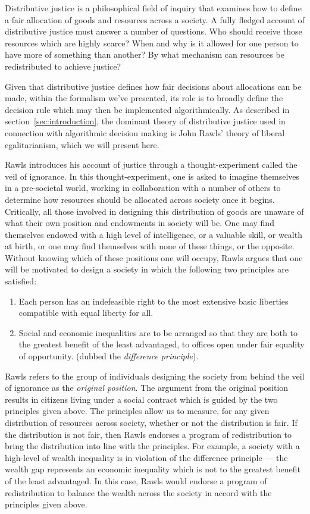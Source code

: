 Distributive justice is a philosophical field of inquiry that examines how to
define a fair allocation of goods and resources across a society. A fully
fledged account of distributive justice must answer a number of questions. Who
should receive those resources which are highly scarce? When and why is it 
allowed for one person to have more of something than another? By what mechanism
can resources be redistributed to achieve justice?

Given that distributive justice defines how fair decisions about allocations can
be made, within the formalism we've presented, its role is to broadly define the
decision rule which may then be implemented algorithmically. As described in
section~\ref{sec:introduction}, the dominant theory of distributive justice used
in connection with algorithmic decision making is John Rawls' theory of liberal
egalitarianism, which we will present here.

Rawls introduces his account of justice through a thought-experiment called the
veil of ignorance. In this thought-experiment, one is asked to imagine
themselves in a pre-societal world, working in collaboration with a number of
others to determine how resources should be allocated across society once it
begins. Critically, all those involved in designing this distribution of goods
are unaware of what their own position and endowments in society will be. One
may find themselves endowed with a high level of intelligence, or a valuable
skill, or wealth at birth, or one may find themselves with none of these things,
or the opposite. Without knowing which of these positions one will occupy,
Rawls argues that one will be motivated to design a society in which the
following two principles are satisfied:

\begin{enumerate}
    \item Each person has an indefeasible right to the most extensive basic 
          liberties compatible with equal liberty for all.
    \item Social and economic inequalities are to be arranged so that they are
          both to the greatest benefit of the least advantaged, to offices
          open under fair equality of opportunity. (dubbed the
          \textit{difference principle}).
\end{enumerate}

Rawls refers to the group of individuals designing the society from behind the
veil of ignorance as the \textit{original position}. The argument from the
original position results in citizens living under a social contract which
is guided by the two principles given above. The principles allow us to measure,
for any given distribution of resources across society, whether or not the
distribution is fair. If the distribution is not fair, then Rawls endorses
a program of redistribution to bring the distribution into line with the
principles. For example, a society with a high-level of wealth inequality is
in violation of the difference principle — the wealth gap represents an economic
inequality which is not to the greatest benefit of the least advantaged. In this
case, Rawls would endorse a program of redistribution to balance the wealth
across the society in accord with the principles given above.

